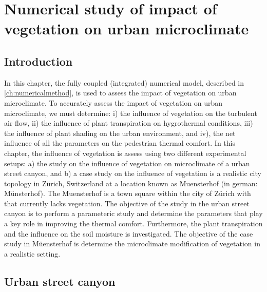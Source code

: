 \chapter{Numerical study of impact of vegetation on urban microclimate}
\label{ch:impactofvegetation}
\def\figdir{chapters/ch08_numericalstudy/figures}	
%		

\section{Introduction}

In this chapter, the fully coupled (integrated) numerical model, described in \cref{ch:numericalmethod}, is used to assess the impact of vegetation on urban microclimate. To accurately assess the impact of vegetation on urban microclimate, we must determine: i) the influence of vegetation on the turbulent air flow, ii) the influence of plant transpiration on hygrothermal conditions, iii) the influence of plant shading on the urban environment, and iv), the net influence of all the parameters on the pedestrian thermal comfort. In this chapter, the influence of vegetation is assess using two different experimental setups: a) the study on the influence of vegetation on microclimate of a urban street canyon, and b) a case study on the influence of vegetation is a realistic city topology in Z\"urich, Switzerland at a location known as Muensterhof (in german: M\"unsterhof). The Muensterhof is a town square within the city of Z\"urich with that currently lacks vegetation. The objective of the study in the urban street canyon is to perform a parameteric study and determine the parameters that play a key role in improving the thermal comfort. Furthermore, the plant transpiration and the influence on the soil moisture is investigated. The objective of the case study in M\"uensterhof is determine the microclimate modification of vegetation in a realistic setting.

\section{Urban street canyon}

